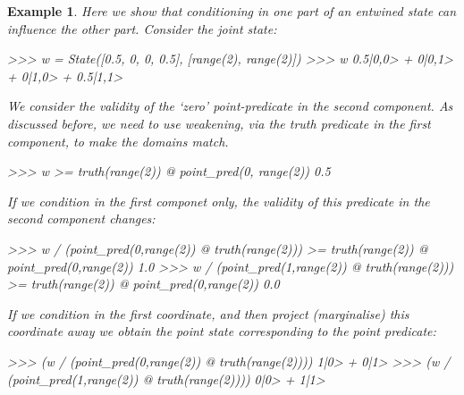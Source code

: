 \documentclass[leqno]{tufte-book} %
\newtheorem{example}[theorem]{Example}
\begin{document}
\begin{example}
\label{ex:dcrossover}
Here we show that conditioning in one part of an entwined
state can influence the other part. Consider the joint
state:
\begin{python}
>>> w = State([0.5, 0, 0, 0.5], [range(2), range(2)])
>>> w
0.5|0,0> + 0|0,1> + 0|1,0> + 0.5|1,1>
\end{python}

\noindent We consider the validity of the `zero' point-predicate in
the second component. As discussed before, we need to use weakening,
via the truth predicate in the first component, to make the domains
match.
\begin{python}
>>> w >= truth(range(2)) @ point_pred(0, range(2))
0.5
\end{python}

\noindent If we condition in the first componet only, the validity
of this predicate in the second component changes:
\begin{python}
>>> w / (point_pred(0,range(2)) @ truth(range(2))) >= truth(range(2)) @ point_pred(0,range(2))
1.0
>>>  w / (point_pred(1,range(2)) @ truth(range(2))) >= truth(range(2)) @ point_pred(0,range(2))
0.0
\end{python}

\noindent If we condition in the first coordinate, and then project
(marginalise) this coordinate away we obtain the point state
corresponding to the point predicate:
\begin{python}
>>> (w / (point_pred(0,range(2)) @ truth(range(2)))) %
1|0> + 0|1>
>>> (w / (point_pred(1,range(2)) @ truth(range(2)))) %
0|0> + 1|1>
\end{python}
\end{example}
\end{document}
